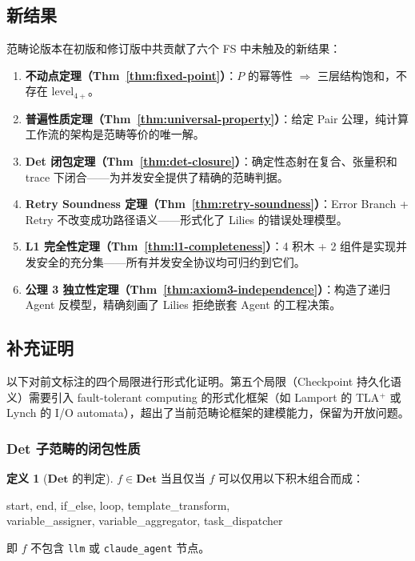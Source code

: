 \documentclass[11pt,a4paper]{article}
\theoremstyle{definition}
\theoremstyle{definition}
\newtheorem{definition}[theorem]{定义}
\theoremstyle{remark}
\newcommand{\cat}[1]{\mathbf{#1}}
\newcommand{\catDet}{\cat{Det}}
\newcommand{\pairMonad}{P}
\begin{document}
\subsection{新结果}

范畴论版本在初版和修订版中共贡献了六个 FS 中未触及的新结果：
\begin{enumerate}[leftmargin=2em,label=(\arabic*)]
    \item \textbf{不动点定理（Thm~\ref{thm:fixed-point}）}：$\pairMonad$ 的幂等性 $\Rightarrow$ 三层结构饱和，不存在 $\mathrm{level}_{4+}$。
    \item \textbf{普遍性质定理（Thm~\ref{thm:universal-property}）}：给定 Pair 公理，纯计算工作流的架构是范畴等价的唯一解。
    \item \textbf{Det 闭包定理（Thm~\ref{thm:det-closure}）}：确定性态射在复合、张量积和 trace 下闭合——为并发安全提供了精确的范畴判据。
    \item \textbf{Retry Soundness 定理（Thm~\ref{thm:retry-soundness}）}：Error Branch + Retry 不改变成功路径语义——形式化了 Lilies 的错误处理模型。
    \item \textbf{L1 完全性定理（Thm~\ref{thm:l1-completeness}）}：4 积木 + 2 组件是实现并发安全的充分集——所有并发安全协议均可归约到它们。
    \item \textbf{公理 3 独立性定理（Thm~\ref{thm:axiom3-independence}）}：构造了递归 Agent 反模型，精确刻画了 Lilies 拒绝嵌套 Agent 的工程决策。
\end{enumerate}

\subsection{补充证明}

以下对前文标注的四个局限进行形式化证明。第五个局限（Checkpoint 持久化语义）需要引入 fault-tolerant computing 的形式化框架（如 Lamport 的 TLA$^{+}$ 或 Lynch 的 I/O automata），超出了当前范畴论框架的建模能力，保留为开放问题。

\subsubsection{Det 子范畴的闭包性质}

\begin{definition}[$\catDet$ 的判定]
$f \in \catDet$ 当且仅当 $f$ 可以仅用以下积木组合而成：
\begin{center}
\small\ttfamily
start, end, if\_else, loop, template\_transform,\\
variable\_assigner, variable\_aggregator, task\_dispatcher
\end{center}
即 $f$ 不包含 \texttt{llm} 或 \texttt{claude\_agent} 节点。
\end{definition}
\end{document}
